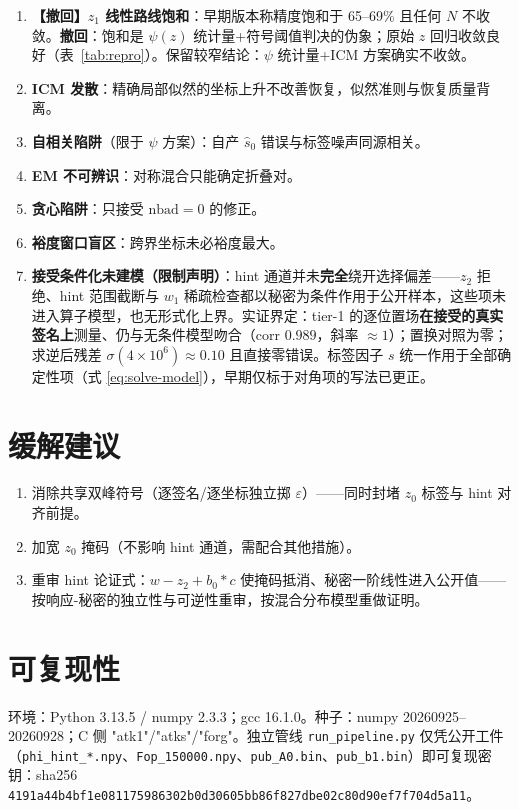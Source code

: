 \documentclass[11pt,a4paper]{ctexart}
\begin{document}
\begin{enumerate}
\item \textbf{【撤回】$z_1$ 线性路线饱和}：早期版本称精度饱和于 65--69\% 且任何 $N$ 不收敛。\textbf{撤回}：饱和是 $\psi(z)$ 统计量+符号阈值判决的伪象；原始 $z$ 回归收敛良好（表~\ref{tab:repro}）。保留较窄结论：$\psi$ 统计量+ICM 方案确实不收敛。
\item \textbf{ICM 发散}：精确局部似然的坐标上升不改善恢复，似然准则与恢复质量背离。
\item \textbf{自相关陷阱}（限于 $\psi$ 方案）：自产 $\hat s_0$ 错误与标签噪声同源相关。
\item \textbf{EM 不可辨识}：对称混合只能确定折叠对。
\item \textbf{贪心陷阱}：只接受 $\mathrm{nbad}=0$ 的修正。
\item \textbf{裕度窗口盲区}：跨界坐标未必裕度最大。
\item \textbf{接受条件化未建模（限制声明）}：hint 通道并未\textbf{完全}绕开选择偏差——$z_2$ 拒绝、hint 范围截断与 $w_1$ 稀疏检查都以秘密为条件作用于公开样本，这些项未进入算子模型，也无形式化上界。实证界定：tier-1 的逐位置场\textbf{在接受的真实签名上}测量、仍与无条件模型吻合（corr $0.989$，斜率 $\approx1$）；置换对照为零；求逆后残差 $\sigma(4\times10^6)\approx0.10$ 且直接零错误。标签因子 $s$ 统一作用于全部确定性项（式 \ref{eq:solve-model}），早期仅标于对角项的写法已更正。
\end{enumerate}

\section{缓解建议}

\begin{enumerate}
\item 消除共享双峰符号（逐签名/逐坐标独立掷 $\varepsilon$）——同时封堵 $z_0$ 标签与 hint 对齐前提。
\item 加宽 $z_0$ 掩码（不影响 hint 通道，需配合其他措施）。
\item 重审 hint 论证式：$w-z_2+b_0*c$ 使掩码抵消、秘密一阶线性进入公开值——按响应-秘密的独立性与可逆性重审，按混合分布模型重做证明。
\end{enumerate}

\section{可复现性}\label{sec:repro}

环境：Python 3.13.5 / numpy 2.3.3；gcc 16.1.0。种子：numpy 20260925--20260928；C 侧 "atk1"/"atks"/"forg"。独立管线 \texttt{run\_pipeline.py} 仅凭公开工件（\texttt{phi\_hint\_*.npy}、\texttt{Fop\_150000.npy}、\texttt{pub\_A0.bin}、\texttt{pub\_b1.bin}）即可复现密钥：sha256 \texttt{4191a44b4bf1e081175986302b0d30605bb86f827dbe02c80d90ef7f704d5a11}。
\end{document}
